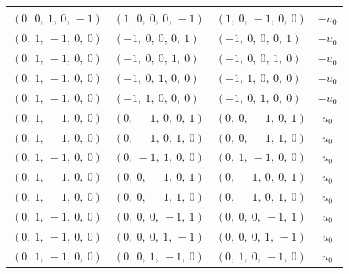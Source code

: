 \documentclass[11pt]{article}
\theoremstyle{definition}
\begin{document}
\begin{longtable}{|l|l|l|c|}
    \hline
    $\left( 0, \  0, \  1, \  0, \  -1\right)$ & $\left( 1, \  0, \  0, \  0, \  -1\right)$ & $\left( 1, \  0, \  -1, \  0, \  0\right)$ & $- u_{0}$ \\
    \hline
    $\left( 0, \  1, \  -1, \  0, \  0\right)$ & $\left( -1, \  0, \  0, \  0, \  1\right)$ & $\left( -1, \  0, \  0, \  0, \  1\right)$ & $- u_{0}$ \\
    \hline
    $\left( 0, \  1, \  -1, \  0, \  0\right)$ & $\left( -1, \  0, \  0, \  1, \  0\right)$ & $\left( -1, \  0, \  0, \  1, \  0\right)$ & $- u_{0}$ \\
    \hline
    $\left( 0, \  1, \  -1, \  0, \  0\right)$ & $\left( -1, \  0, \  1, \  0, \  0\right)$ & $\left( -1, \  1, \  0, \  0, \  0\right)$ & $- u_{0}$ \\
    \hline
    $\left( 0, \  1, \  -1, \  0, \  0\right)$ & $\left( -1, \  1, \  0, \  0, \  0\right)$ & $\left( -1, \  0, \  1, \  0, \  0\right)$ & $- u_{0}$ \\
    \hline
    $\left( 0, \  1, \  -1, \  0, \  0\right)$ & $\left( 0, \  -1, \  0, \  0, \  1\right)$ & $\left( 0, \  0, \  -1, \  0, \  1\right)$ & $u_{0}$ \\
    \hline
    $\left( 0, \  1, \  -1, \  0, \  0\right)$ & $\left( 0, \  -1, \  0, \  1, \  0\right)$ & $\left( 0, \  0, \  -1, \  1, \  0\right)$ & $u_{0}$ \\
    \hline
    $\left( 0, \  1, \  -1, \  0, \  0\right)$ & $\left( 0, \  -1, \  1, \  0, \  0\right)$ & $\left( 0, \  1, \  -1, \  0, \  0\right)$ & $u_{0}$ \\
    \hline
    $\left( 0, \  1, \  -1, \  0, \  0\right)$ & $\left( 0, \  0, \  -1, \  0, \  1\right)$ & $\left( 0, \  -1, \  0, \  0, \  1\right)$ & $u_{0}$ \\
    \hline
    $\left( 0, \  1, \  -1, \  0, \  0\right)$ & $\left( 0, \  0, \  -1, \  1, \  0\right)$ & $\left( 0, \  -1, \  0, \  1, \  0\right)$ & $u_{0}$ \\
    \hline
    $\left( 0, \  1, \  -1, \  0, \  0\right)$ & $\left( 0, \  0, \  0, \  -1, \  1\right)$ & $\left( 0, \  0, \  0, \  -1, \  1\right)$ & $u_{0}$ \\
    \hline
    $\left( 0, \  1, \  -1, \  0, \  0\right)$ & $\left( 0, \  0, \  0, \  1, \  -1\right)$ & $\left( 0, \  0, \  0, \  1, \  -1\right)$ & $u_{0}$ \\
    \hline
    $\left( 0, \  1, \  -1, \  0, \  0\right)$ & $\left( 0, \  0, \  1, \  -1, \  0\right)$ & $\left( 0, \  1, \  0, \  -1, \  0\right)$ & $u_{0}$ \\

\end{longtable}
\end{document}
